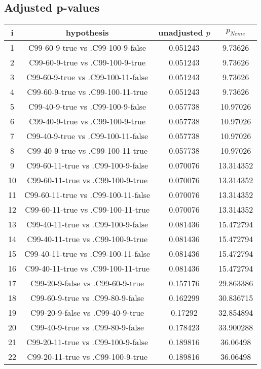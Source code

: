 \documentclass[a4paper,10pt]{article}
\begin{document}
\begin{landscape}
\pagebreak

\subsection{Adjusted p-values}

\begin{table}[!htp]
\centering\scriptsize
\begin{tabular}{cccc}
i&hypothesis&unadjusted $p$&$p_{Neme}$\\
\hline1&C99-60-9-true vs .C99-100-9-false&0.051243&9.73626\\
2&C99-60-9-true vs .C99-100-9-true&0.051243&9.73626\\
3&C99-60-9-true vs .C99-100-11-false&0.051243&9.73626\\
4&C99-60-9-true vs .C99-100-11-true&0.051243&9.73626\\
5&C99-40-9-true vs .C99-100-9-false&0.057738&10.97026\\
6&C99-40-9-true vs .C99-100-9-true&0.057738&10.97026\\
7&C99-40-9-true vs .C99-100-11-false&0.057738&10.97026\\
8&C99-40-9-true vs .C99-100-11-true&0.057738&10.97026\\
9&C99-60-11-true vs .C99-100-9-false&0.070076&13.314352\\
10&C99-60-11-true vs .C99-100-9-true&0.070076&13.314352\\
11&C99-60-11-true vs .C99-100-11-false&0.070076&13.314352\\
12&C99-60-11-true vs .C99-100-11-true&0.070076&13.314352\\
13&C99-40-11-true vs .C99-100-9-false&0.081436&15.472794\\
14&C99-40-11-true vs .C99-100-9-true&0.081436&15.472794\\
15&C99-40-11-true vs .C99-100-11-false&0.081436&15.472794\\
16&C99-40-11-true vs .C99-100-11-true&0.081436&15.472794\\
17&C99-20-9-false vs .C99-60-9-true&0.157176&29.863386\\
18&C99-60-9-true vs .C99-80-9-false&0.162299&30.836715\\
19&C99-20-9-false vs .C99-40-9-true&0.17292&32.854894\\
20&C99-40-9-true vs .C99-80-9-false&0.178423&33.900288\\
21&C99-20-11-true vs .C99-100-9-false&0.189816&36.06498\\
22&C99-20-11-true vs .C99-100-9-true&0.189816&36.06498\\

\end{tabular}
\end{table}
\end{landscape}
\end{document}
